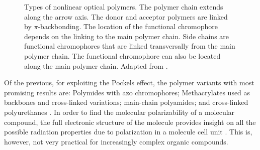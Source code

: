 \begin{figure}[!ht]
\centering
  
  \caption{Types of nonlinear optical polymers. The polymer chain extends along the arrow axis. The donor and acceptor polymers are linked by $\pi$-backbonding. The location of the functional chromophore depends on the linking to the main polymer chain. Side chains are functional chromophores that are linked transversally from the main polymer chain. The functional chromophore can also be located along the main polymer chain. Adapted from \cite{GuenterNLO12}.}
  \label{fig:nlopoly}
\end{figure}
Of the previous, for exploiting the Pockels effect, the polymer variants with most promising results are: Polymides with azo chromophores; Methacrylates used as backbones and cross-linked variations; main-chain polyamides; and cross-linked polyurethanes \cite{GuenterNLO12}. In order to find the molecular polarizability of a molecular compound, the full electronic structure of the molecule provides insight on all the possible radiation properties due to polarization in a molecule cell unit \cite{NLOPertWard65}. This is, however, not very practical for increasingly complex organic compounds.




